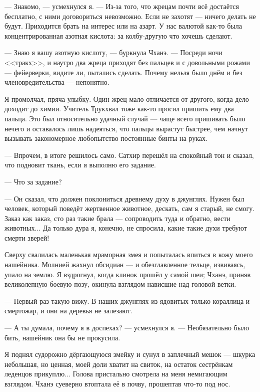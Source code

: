 --- Знакомо, --- усмехнулся я.
--- Из-за того, что жрецам почти всё достаётся бесплатно, с ними договориться невозможно.
Если не захотят --- ничего делать не будут.
Приходится брать на интерес или на азарт.
У нас валютой как-то была концентрированная азотная кислота: за колбу-другую что хочешь сделают.

--- Знаю я вашу азотную кислоту, --- буркнула Чханэ. --- Посреди ночи <<тракх>>\FM, и наутро два жреца приходят без пальцев и с довольными рожами --- фейерверки, видите ли, пытались сделать.
Почему нельзя было днём и без членовредительства --- непонятно.

Я промолчал, пряча улыбку.
Один жрец мало отличается от другого, когда дело доходит до химии.
Учитель Трукхвал тоже как-то просил пришить ему два пальца.
Это был относительно удачный случай --- чаще всего пришивать было нечего и оставалось лишь надеяться, что пальцы вырастут быстрее, чем начнут вызывать закономерное любопытство постоянные бинты на руках.

--- Впрочем, в итоге решилось само.
Сатхир перешёл на спокойный тон и сказал, что подновит ткань, если я выполню его задание.

--- Что за задание?

--- Он сказал, что должен поклониться древнему духу в джунглях.
Нужен был человек, который поведёт жертвенное животное, дескать, сам я старый, не смогу.
Заказ как заказ, сто раз такие брала --- сопроводить туда и обратно, вести животных...
Да только дура я, конечно, не спросила, какие такие духи требуют смерти зверей!

Сверху свалилась маленькая мраморная змея и попыталась впиться в кожу моего нашейника.
Молнией жахнул обсидиан --- и обезглавленное тельце, извиваясь, упало на землю.
Я вздрогнул, когда клинок прошёл у самой шеи;
Чханэ, приняв великолепную боевую позу, окинула взглядом нависшие над головой ветки.

--- Первый раз такую вижу.
В наших джунглях из ядовитых только кораллица и смертожар, и они на деревья не залезают.

--- А ты думала, почему я в доспехах? --- усмехнулся я.
--- Необязательно было бить, нашейник она бы не прокусила.

Я поднял судорожно дёргающуюся змейку и сунул в заплечный мешок --- шкурка небольшая, но ценная, моей доли хватит на свиток, на остаток сестрёнкам леденцов прикуплю...
Голова пристально смотрела на меня немигающим взглядом.
Чханэ суеверно втоптала её в почву, прошептав что-то под нос.

